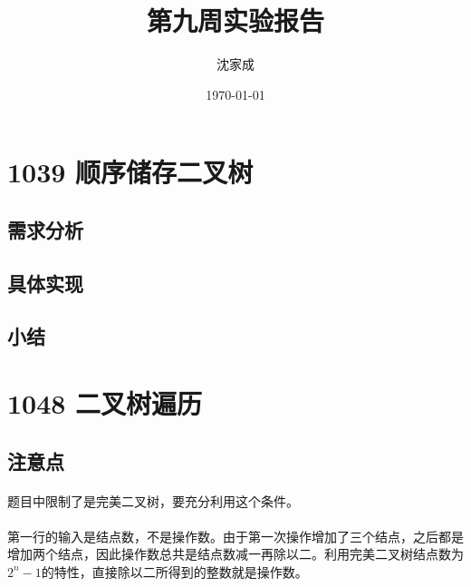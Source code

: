 \documentclass[UTF-8, 12pt]{ctexart}
\title{第九周实验报告}
\author{沈家成}
\date{\today}
\begin{document}
\maketitle
\section{1039 顺序储存二叉树}
    \subsection{需求分析}
    \paragraph{}
    \subsection{具体实现}
    \paragraph{}
    \paragraph{}
    \subsection{小结}
    \paragraph{}
	    
\section{1048 二叉树遍历}
	\subsection{注意点}
    \paragraph{}
    题目中限制了是完美二叉树，要充分利用这个条件。
    \paragraph{}
	第一行的输入是结点数，不是操作数。由于第一次操作增加了三个结点，之后都是增加两个结点，因此操作数总共是结点数减一再除以二。利用完美二叉树结点数为$2^n - 1$的特性，直接除以二所得到的整数就是操作数。
\end{document}
